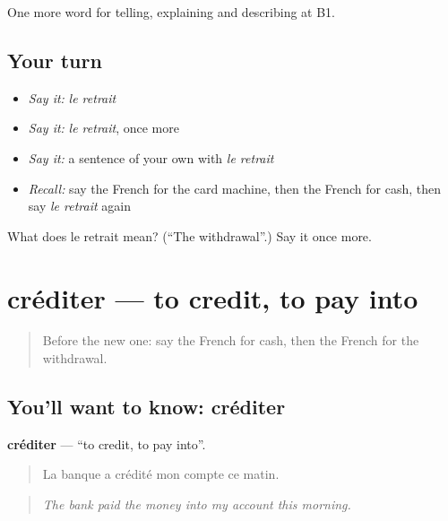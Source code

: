 \begin{grammarlens}[title={What you've built}]
One more word for telling, explaining and describing at B1.
\end{grammarlens}

\subsection*{Your turn}
\begin{itemize}
\raggedright
  \item \emph{Say it:} \emph{le retrait}
  \item \emph{Say it:} \emph{le retrait}, once more
  \item \emph{Say it:} a sentence of your own with \emph{le retrait}
  \item \emph{Recall:} say the French for the card machine, then the French for cash, then say \emph{le retrait} again
\end{itemize}

\begin{tcolorbox}[breakable,colback=teal!4,colframe=teal!35!black,title={Before you move on}]
What does le retrait mean? (\textquotedblleft{}The withdrawal\textquotedblright{}.) Say it once more.
\end{tcolorbox}
\section[créditer]{créditer — to credit, to pay into}

\label{lesson:FR-C451-crediter}



\begin{quote}
Before the new one: say the French for cash, then the French for the withdrawal.
\end{quote}

\subsection*{You'll want to know: créditer}
\textbf{créditer} — \textquotedblleft{}to credit, to pay into\textquotedblright{}.

\begin{quote}
La banque a crédité mon compte ce matin.
\end{quote}

\begin{quote}
\emph{The bank paid the money into my account this morning.}
\end{quote}

